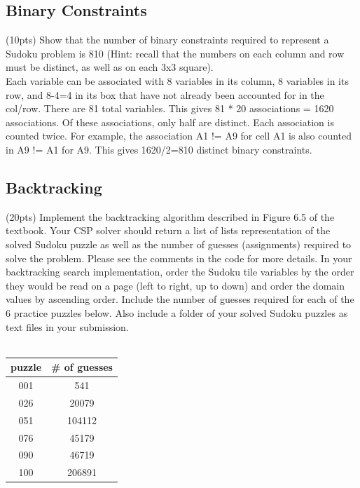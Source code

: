 \documentclass{article}
\begin{document}
\subsection{Binary Constraints} (10pts) Show that the number of binary constraints required to represent a Sudoku problem is 810 (Hint: recall that the numbers on each column and row must be distinct, as well as on each 3x3 square).\\

Each variable can be associated with 8 variables in its column, 8 variables in its row, and 8-4=4 in its box that have not already been accounted for in the col/row. There are 81 total variables. This gives 81 * 20 associations = 1620 associations. Of these associations, only half are distinct. Each association is counted twice. For example, the association A1 != A9 for cell A1 is also counted in A9 != A1 for A9. This gives 1620/2=810 distinct binary constraints.

\subsection{Backtracking} (20pts) Implement the backtracking algorithm described in Figure 6.5 of the textbook. Your CSP solver should return a list of lists representation of the solved Sudoku puzzle as well as the number of guesses (assignments) required to solve the problem. Please see the comments in the code for more details. In your backtracking search implementation, order the Sudoku tile variables by the order they would be read on a page (left to right, up to down) and order the domain values by ascending order. Include the number of guesses required for each of the 6 practice puzzles below. Also include a folder of your solved Sudoku puzzles as text files in your submission.\\
\\
\begin{center}
\begin{tabular}{c||c}
    puzzle & \# of guesses \\ \hline
    001 & 541 \\ \hline
    026 & 20079 \\ \hline
    051 & 104112 \\ \hline
    076 & 45179 \\ \hline
    090 & 46719 \\ \hline
    100 & 206891 \\ \hline
\end{tabular}
\end{center}
\end{document}
